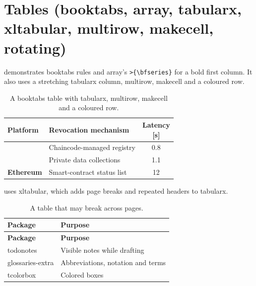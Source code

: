 \section{Tables (booktabs, array, tabularx, xltabular, multirow, makecell, rotating)}\label{app:latex:tables}
 demonstrates booktabs rules and array's \texttt{>\{\textbackslash bfseries\}} for a bold first column. It also uses a stretching tabularx column, multirow, makecell and a coloured row.
\begin{table}[!ht]
  \centering
  \caption{A booktabs table with tabularx, multirow, makecell and a coloured row.}\label{tab:latex:booktabs}
  \begin{tabularx}{\linewidth}{>{\bfseries}l X c}
    \toprule
    Platform & Revocation mechanism & \makecell{Latency\\{[s]}} \\
    \midrule
    \multirow{2}{*}{Fabric} & Chaincode-managed registry & 0.8 \\
     & Private data collections & 1.1 \\
    \rowcolor{gray!15}
    Ethereum & Smart-contract status list & 12 \\
    \bottomrule
  \end{tabularx}
\end{table}

 uses xltabular, which adds page breaks and repeated headers to tabularx.
\begin{xltabular}{\linewidth}{l X}
  \caption{A table that may break across pages.}\label{tab:latex:long}\\
  \toprule
  \textbf{Package} & \textbf{Purpose} \\
  \midrule
  \endfirsthead
  \toprule
  \textbf{Package} & \textbf{Purpose} \\
  \midrule
  \endhead
  todonotes & Visible notes while drafting \\
  glossaries-extra & Abbreviations, notation and terms \\
  tcolorbox & Colored boxes \\
  \bottomrule
\end{xltabular}

